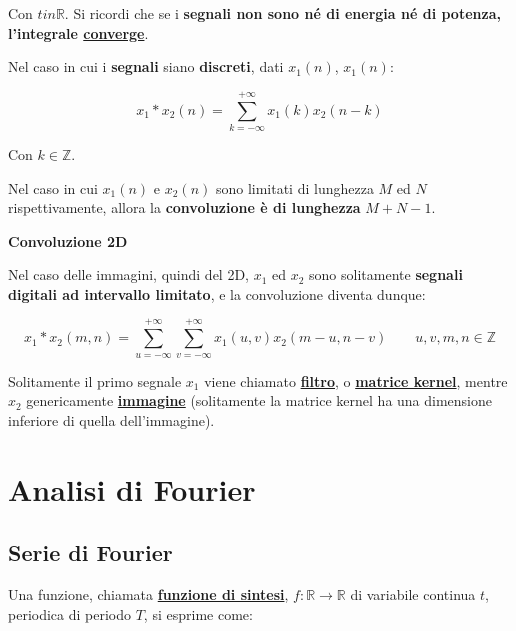\documentclass[a4paper]{article}
\begin{document}
	\noindent
	Con $t in \mathbb{R}$. Si ricordi che se i \textbf{segnali non sono né di energia né di potenza, l'integrale \underline{converge}}.\newline
	
	\noindent
	Nel caso in cui i \textbf{segnali} siano \textbf{discreti}, dati $x_{1}\left(n\right)$, $x_{1}\left(n\right)$:
	
	\begin{equation*}
		x_{1} * x_{2} \left(n\right) = \sum_{k = -\infty}^{+\infty} x_{1}\left(k\right) x_{2}\left(n - k\right)
	\end{equation*}

	\noindent
	Con $k \in \mathbb{Z}$.
	
	\noindent
	Nel caso in cui $x_{1} \left(n\right)$ e $x_{2} \left(n\right)$ sono limitati di lunghezza $M$ ed $N$ rispettivamente, allora la \textbf{convoluzione è di lunghezza} $M+N-1$.\newline
	
	\noindent
	\textcolor{Green4}{\textbf{Convoluzione 2D}}\newline
	
	\noindent
	Nel caso delle immagini, quindi del 2D, $x_{1}$ ed $x_{2}$ sono solitamente \textbf{segnali digitali ad intervallo limitato}, e la convoluzione diventa dunque:
	
	\begin{equation*}
		x_{1} * x_{2}\left(m,n\right) = \sum_{u = -\infty}^{+\infty} \sum_{v = -\infty}^{+\infty} x_{1} \left(u,v\right) x_{2}\left(m - u, n - v\right) \hspace{2em} u,v,m,n\in\mathbb{Z}
	\end{equation*}

	\noindent
	Solitamente il primo segnale $x_{1}$ viene chiamato \textbf{\underline{filtro}}, o \textbf{\underline{matrice kernel}}, mentre $x_{2}$ genericamente \textbf{\underline{immagine}} (solitamente la matrice kernel ha una dimensione inferiore di quella dell'immagine).
	
	\newpage
	
	\section{Analisi di Fourier}
	
	\subsection{Serie di Fourier}
	
	Una funzione, chiamata \textbf{\underline{funzione di sintesi}}, $f: \mathbb{R} \rightarrow \mathbb{R}$ di variabile continua $t$, periodica di periodo $T$, si esprime come:
	
\end{document}
